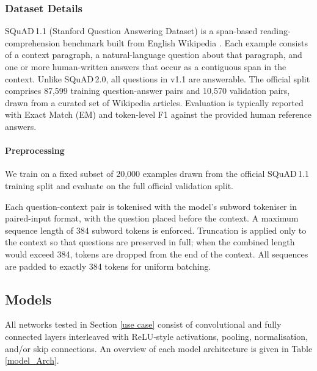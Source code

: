 \documentclass{article}
\theoremstyle{plain}
\theoremstyle{definition}
\theoremstyle{remark}
\begin{document}
\subsubsection*{Dataset Details}
SQuAD\,1.1 (Stanford Question Answering Dataset) is a span-based reading-comprehension benchmark built from English Wikipedia \cite{rajpurkar_squad_2016}. Each example consists of a context paragraph, a natural-language question about that paragraph, and one or more human-written answers that occur as a contiguous span in the context. Unlike SQuAD\,2.0, all questions in v1.1 are answerable. The official split comprises 87{,}599 training question-answer pairs and 10{,}570 validation pairs, drawn from a curated set of Wikipedia articles. Evaluation is typically reported with Exact Match (EM) and token-level F1 against the provided human reference answers.
\paragraph{Preprocessing}
We train on a fixed subset of 20{,}000 examples drawn from the official SQuAD\,1.1 training split and evaluate on the full official validation split. 

Each question-context pair is tokenised with the model’s subword tokeniser in paired-input format, with the question placed before the context. A maximum sequence length of 384 subword tokens is enforced. Truncation is applied only to the context so that questions are preserved in full; when the combined length would exceed 384, tokens are dropped from the end of the context. All sequences are padded to exactly 384 tokens for uniform batching.




\subsection{Models}\label{models}

All networks tested in Section \ref{use case} consist of convolutional and fully connected layers interleaved with ReLU‐style activations, pooling, normalisation, and/or skip connections. An overview of each model architecture is given in Table \ref{model_Arch}.
\end{document}

